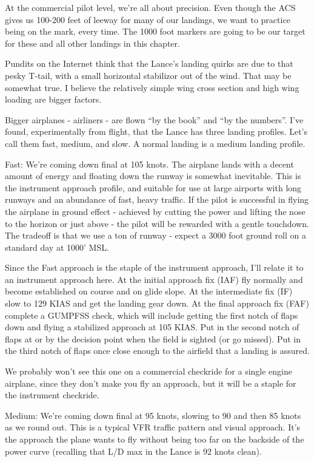At the commercial pilot level, we're all about precision. Even though the ACS gives us 100-200 feet of leeway for many of our landings, we want to practice being on the mark, every time. The 1000 foot markers are going to be our target for these and all other landings in this chapter.

Pundits on the Internet think that the Lance's landing quirks are due to that pesky T-tail, with a small horizontal stabilizor out of the wind. That may be somewhat true. I believe the relatively simple wing cross section and high wing loading are bigger factors.

Bigger airplanes - airliners - are flown ``by the book'' and ``by the numbers''. I've found, experimentally from flight, that the Lance has three landing profiles. Let's call them fast, medium, and slow. A normal landing is a medium landing profile.

Fast: We're coming down final at 105 knots. The airplane lands with a decent amount of energy and floating down the runway is somewhat inevitable. This is the instrument approach profile, and suitable for use at large airports with long runways and an abundance of fast, heavy traffic. If the pilot is successful in flying the airplane in ground effect - achieved by cutting the power and lifting the nose to the horizon or just above - the pilot will be rewarded with a gentle touchdown. The tradeoff is that we use a ton of runway - expect a 3000 foot ground roll on a standard day at 1000' MSL.

Since the Fast approach is the staple of the instrument approach, I'll relate it to an instrument approach here. At the initial approach fix (IAF) fly normally and become established on course and on glide slope. At the intermediate fix (IF) slow to 129 KIAS and get the landing gear down. At the final approach fix (FAF) complete a GUMPFSS check, which will include getting the first notch of flaps down and flying a stabilized approach at 105 KIAS. Put in the second notch of flaps at or by the decision point when the field is sighted (or go missed). Put in the third notch of flaps once close enough to the airfield that a landing is assured.

We probably won't see this one on a commercial checkride for a single engine airplane, since they don't make you fly an approach, but it will be a staple for the instrument checkride.

Medium: We're coming down final at 95 knots, slowing to 90 and then 85 knots as we round out. This is a typical VFR traffic pattern and visual approach. It's the approach the plane wants to fly without being too far on the backside of the power curve (recalling that L/D max in the Lance is 92 knots clean).

